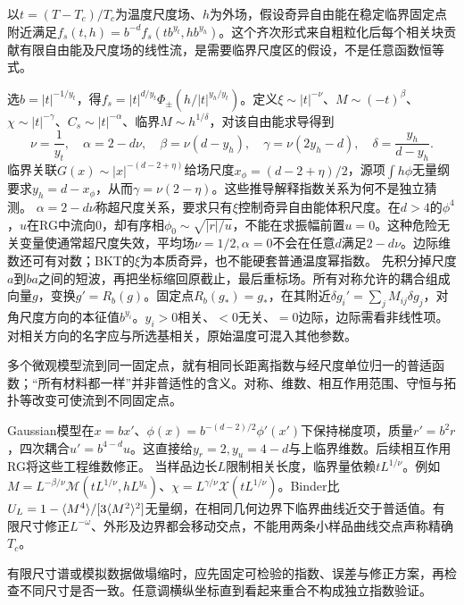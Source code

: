 \label{ch:scaling}
以$t=(T-T_c)/T_c$为温度尺度场、$h$为外场，假设奇异自由能在稳定临界固定点附近满足$f_s(t,h)=b^{-d}f_s(tb^{y_t},hb^{y_h})$。这个齐次形式来自粗粒化后每个相关块贡献有限自由能及尺度场的线性流，是需要临界尺度区的假设，不是任意函数恒等式。

选$b=|t|^{-1/y_t}$，得$f_s=|t|^{d/y_t}\Phi_\pm(h/|t|^{y_h/y_t})$。定义$\xi\sim|t|^{-\nu}$、$M\sim(-t)^\beta$、$\chi\sim|t|^{-\gamma}$、$C_s\sim|t|^{-\alpha}$、临界$M\sim h^{1/\delta}$，对该自由能求导得到
\begin{equation}
\nu=\frac1{y_t},\quad\alpha=2-d\nu,\quad\beta=\nu(d-y_h),\quad\gamma=\nu(2y_h-d),\quad\delta=\frac{y_h}{d-y_h}.
\end{equation}
临界关联$G(x)\sim|x|^{-(d-2+\eta)}$给场尺度$x_\phi=(d-2+\eta)/2$，源项$\int h\phi$无量纲要求$y_h=d-x_\phi$，从而$\gamma=\nu(2-\eta)$。这些推导解释指数关系为何不是独立猜测。
$\alpha=2-d\nu$称超尺度关系，要求只有$\xi$控制奇异自由能体积尺度。在$d>4$的$\phi^4$，$u$在RG中流向0，却有序相$\phi_0\sim\sqrt{|r|/u}$，不能在求振幅前置$u=0$。这种危险无关变量使通常超尺度失效，平均场$\nu=1/2,\alpha=0$不会在任意$d$满足$2-d\nu$。边际维数还可有对数；BKT的$\xi$为本质奇异，也不能硬套普通温度幂指数。
先积分掉尺度$a$到$ba$之间的短波，再把坐标缩回原截止，最后重标场。所有对称允许的耦合组成向量$g$，变换$g'=R_b(g)$。固定点$R_b(g_*)=g_*$，在其附近$\delta g_i'=\sum_jM_{ij}\delta g_j$，对角尺度方向的本征值$b^{y_i}$。$y_i>0$相关、$<0$无关、$=0$边际，边际需看非线性项。对相关方向的名字应与所选基相关，原始温度可混入其他参数。

多个微观模型流到同一固定点，就有相同长距离指数与经尺度单位归一的普适函数；“所有材料都一样”并非普适性的含义。对称、维数、相互作用范围、守恒与拓扑等改变可使流到不同固定点。

Gaussian模型在$x=bx'$、$\phi(x)=b^{-(d-2)/2}\phi'(x')$下保持梯度项，质量$r'=b^2r$，四次耦合$u'=b^{4-d}u$。这直接给$y_r=2,y_u=4-d$与上临界维数。后续相互作用RG将这些工程维数修正。
当样品边长$L$限制相关长度，临界量依赖$tL^{1/\nu}$。例如$M=L^{-\beta/\nu}\mathcal M(tL^{1/\nu},hL^{y_h})$、$\chi=L^{\gamma/\nu}\mathcal X(tL^{1/\nu})$。Binder比$U_L=1-\langle M^4\rangle/[3\langle M^2\rangle^2]$无量纲，在相同几何边界下临界曲线近交于普适值。有限尺寸修正$L^{-\omega}$、外形及边界都会移动交点，不能用两条小样品曲线交点声称精确$T_c$。

有限尺寸谱或模拟数据做塌缩时，应先固定可检验的指数、误差与修正方案，再检查不同尺寸是否一致。任意调横纵坐标直到看起来重合不构成独立指数验证。
